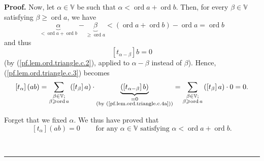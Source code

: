 \documentclass[numbers=enddot,12pt,final,onecolumn,notitlepage]{scrartcl}%
\theoremstyle{definition}
\newenvironment{proof}[1][Proof]{\noindent\textbf{#1.} }{\ \rule{0.5em}{0.5em}}
\let\sumnonlimits\sum
\renewcommand{\sum}{\sumnonlimits\limits}
\renewcommand{\geq}{\geqslant}
\theoremstyle{plainsl}
\begin{document}
\begin{proof}
Now, let $\alpha\in\mathbb{V}$ be such that $\alpha<\operatorname*{ord}%
a+\operatorname*{ord}b$. Then, for every $\beta\in\mathbb{V}$ satisfying
$\beta\geq\operatorname*{ord}a$, we have
\[
\underbrace{\alpha}_{<\operatorname*{ord}a+\operatorname*{ord}b}%
-\underbrace{\beta}_{\geq\operatorname*{ord}a}<\left(  \operatorname*{ord}%
a+\operatorname*{ord}b\right)  -\operatorname*{ord}a=\operatorname*{ord}b
\]
and thus%
\begin{equation}
\left[  t_{\alpha-\beta}\right]  b=0 \label{pf.lem.ord.triangle.c.4a}%
\end{equation}
(by (\ref{pf.lem.ord.triangle.c.2}), applied to $\alpha-\beta$ instead of
$\beta$). Hence, (\ref{pf.lem.ord.triangle.c.3}) becomes%
\[
\left[  t_{\alpha}\right]  \left(  ab\right)  =\sum_{\substack{\beta
\in\mathbb{V};\\\beta\geq\operatorname*{ord}a}}\left(  \left[  t_{\beta
}\right]  a\right)  \cdot\underbrace{\left(  \left[  t_{\alpha-\beta}\right]
b\right)  }_{\substack{=0\\\text{(by (\ref{pf.lem.ord.triangle.c.4a}))}}%
}=\sum_{\substack{\beta\in\mathbb{V};\\\beta\geq\operatorname*{ord}a}}\left(
\left[  t_{\beta}\right]  a\right)  \cdot0=0.
\]


Forget that we fixed $\alpha$. We thus have proved that%
\begin{equation}
\left[  t_{\alpha}\right]  \left(  ab\right)  =0\ \ \ \ \ \ \ \ \ \ \text{for
any }\alpha\in\mathbb{V}\text{ satisfying }\alpha<\operatorname*{ord}%
a+\operatorname*{ord}b. \label{pf.lem.ord.triangle.c.5}%
\end{equation}



\end{proof}
\end{document}
